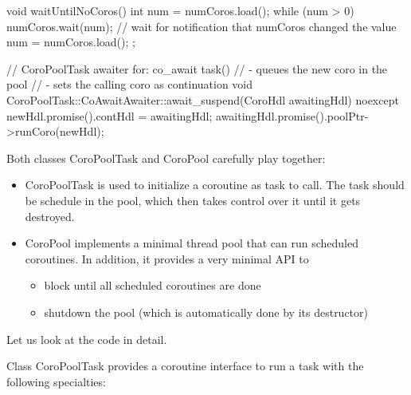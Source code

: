 \begin{cpp}
{	void waitUntilNoCoros() {
		int num = numCoros.load();
		while (num > 0) {
		numCoros.wait(num); // wait for notification that numCoros changed the value
		num = numCoros.load();
		}
	}
};

// CoroPoolTask awaiter for: co_await task()
// - queues the new coro in the pool
// - sets the calling coro as continuation
void CoroPoolTask::CoAwaitAwaiter::await_suspend(CoroHdl awaitingHdl) noexcept
{
	newHdl.promise().contHdl = awaitingHdl;
	awaitingHdl.promise().poolPtr->runCoro(newHdl);
}
\end{cpp}

Both classes CoroPoolTask and CoroPool carefully play together:

\begin{itemize}
\item 
CoroPoolTask is used to initialize a coroutine as task to call. The task should be schedule in the pool, which then takes control over it until it gets destroyed.

\item 
CoroPool implements a minimal thread pool that can run scheduled coroutines. In addition, it provides a very minimal API to
\begin{itemize}
\item 
block until all scheduled coroutines are done

\item
shutdown the pool (which is automatically done by its destructor)
\end{itemize}
\end{itemize}

Let us look at the code in detail.


Class CoroPoolTask provides a coroutine interface to run a task with the following specialties:

